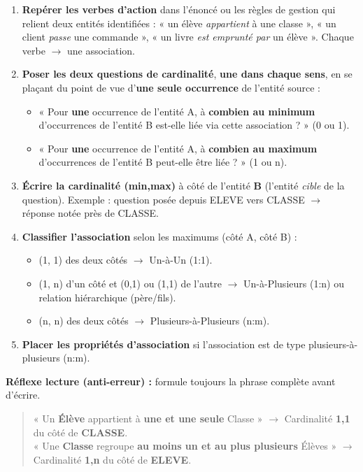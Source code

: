 \documentclass[11pt]{article}
\newcommand{\cle}[1]{{\popxbold\color{popdark}#1}}
\begin{document}
\begin{methode}
\begin{enumerate}
  \item \textbf{Repérer les verbes d'action} dans l'énoncé ou les règles de gestion qui relient deux entités identifiées : « un élève \emph{appartient} à une classe », « un client \emph{passe} une commande », « un livre \emph{est emprunté par} un élève ». Chaque verbe $\rightarrow$ une association.
  \item \textbf{Poser les deux questions de cardinalité}, \textbf{une dans chaque sens}, en se plaçant du point de vue d'\textbf{une seule occurrence} de l'entité source :
  \begin{itemize}
    \item « Pour \textbf{une} occurrence de l'entité A, à \textbf{combien au minimum} d'occurrences de l'entité B est-elle liée via cette association ? » (0 ou 1).
    \item « Pour \textbf{une} occurrence de l'entité A, à \textbf{combien au maximum} d'occurrences de l'entité B peut-elle être liée ? » (1 ou n).
  \end{itemize}
  \item \textbf{Écrire la cardinalité (min,max)} à côté de l'entité \textbf{B} (l'entité \emph{cible} de la question). Exemple : question posée depuis ELEVE vers CLASSE $\rightarrow$ réponse notée près de CLASSE.
  \item \textbf{Classifier l'association} selon les maximums (côté A, côté B) :
  \begin{itemize}
    \item (1, 1) des deux côtés $\rightarrow$ \cle{Un-à-Un} (1:1).
    \item (1, n) d'un côté et (0,1) ou (1,1) de l'autre $\rightarrow$ \cle{Un-à-Plusieurs} (1:n) ou relation hiérarchique (père/fils).
    \item (n, n) des deux côtés $\rightarrow$ \cle{Plusieurs-à-Plusieurs} (n:m).
  \end{itemize}
  \item \textbf{Placer les propriétés d'association} si l'association est de type plusieurs-à-plusieurs (n:m).
\end{enumerate}
\textbf{Réflexe lecture (anti-erreur) :} formule toujours la phrase complète avant d'écrire.
\begin{quote}
« Un \textbf{Élève} appartient à \textbf{une et une seule} Classe » $\rightarrow$ Cardinalité \textbf{1,1} du côté de \textbf{CLASSE}. \\
« Une \textbf{Classe} regroupe \textbf{au moins un et au plus plusieurs} Élèves » $\rightarrow$ Cardinalité \textbf{1,n} du côté de \textbf{ELEVE}.
\end{quote}
\end{methode}
\end{document}
